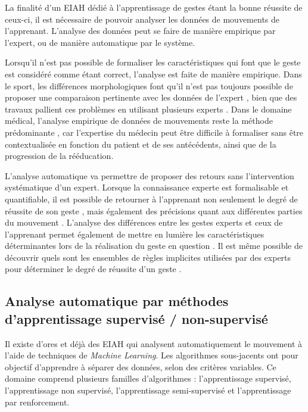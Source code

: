 La finalité d'un EIAH dédié à l'apprentissage de gestes étant la bonne réussite de ceux-ci, il est nécessaire de pouvoir analyser les données de mouvements de l'apprenant. L'analyse des données peut se faire de manière empirique par l'expert, ou de manière automatique par le système.

Lorsqu'il n'est pas possible de formaliser les caractéristiques qui font que le geste est considéré comme étant correct, l'analyse est faite de manière empirique. Dans le sport, les différences morphologiques font qu'il n'est pas toujours possible de proposer une comparaison pertinente avec les données de l'expert \parencite{Burns2011Uvh}, bien que des travaux pallient ces problèmes en utilisant plusieurs experts \parencite{Yoshinaga2015Doa}. Dans le domaine médical, l'analyse empirique de données de mouvements reste la méthode prédominante \parencite{Chen2016TPG, Wang2013HMM, Alankus2010TCG}, car l'expertise du médecin peut être difficile à formaliser sans être contextualisée en fonction du patient et de ses antécédents, ainsi que de la progression de la rééducation.

L'analyse automatique va permettre de proposer des retours sans l'intervention systématique d'un expert. Lorsque la connaissance experte est formalisable et quantifiable, il est possible de retourner à l'apprenant non seulement le degré de réussite de son geste \parencite{Maes2012DtM}, mais également des précisions quant aux différentes parties du mouvement \parencite{YAMAOKA2013912}. L'analyse des différences entre les gestes experts et ceux de l'apprenant permet également de mettre en lumière les caractéristiques déterminantes lors de la réalisation du geste en question \parencite{Makio2007DoS}. Il est même possible de découvrir quels sont les ensembles de règles implicites utilisées par des experts pour déterminer le degré de réussite d'un geste \parencite{Pirsiavash2014AQA}.

\subsection{Analyse automatique par méthodes d'apprentissage supervisé / non-supervisé}
Il existe d'ores et déjà des EIAH qui analysent automatiquement le mouvement à l'aide de techniques de \textit{Machine Learning}. Les algorithmes sous-jacents ont pour objectif d'apprendre à séparer des données, selon des critères variables. Ce domaine comprend plusieurs familles d'algorithmes : l'apprentissage supervisé, l'apprentissage non supervisé, l'apprentissage semi-supervisé et l'apprentissage par renforcement.

